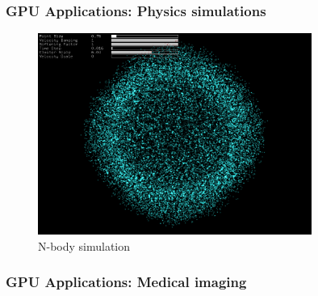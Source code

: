 \documentclass{beamer}
\begin{document}
\begin{frame}
  \frametitle{GPU Applications: Physics simulations}
  \begin{figure}
    \centering
    \includegraphics[width=0.8\textwidth]{graphics/opencl_nbody.jpg}
    \caption{N-body simulation}
\label{fig:simulation}
\end{figure}

\end{frame}
\begin{frame}
  \frametitle{GPU Applications: Medical imaging}

\end{frame}
\end{document}
